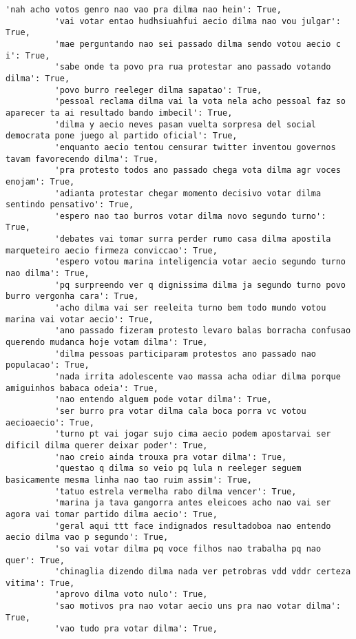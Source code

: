 \documentclass[11pt]{article}
\begin{document}
\begin{Verbatim}[commandchars=\\\{\}]
          'nah acho votos genro nao vao pra dilma nao hein': True,
          'vai votar entao hudhsiuahfui aecio dilma nao vou julgar': True,
          'mae perguntando nao sei passado dilma sendo votou aecio c i': True,
          'sabe onde ta povo pra rua protestar ano passado votando dilma': True,
          'povo burro reeleger dilma sapatao': True,
          'pessoal reclama dilma vai la vota nela acho pessoal faz so aparecer ta ai resultado bando imbecil': True,
          'dilma y aecio neves pasan vuelta sorpresa del social democrata pone juego al partido oficial': True,
          'enquanto aecio tentou censurar twitter inventou governos tavam favorecendo dilma': True,
          'pra protesto todos ano passado chega vota dilma agr voces enojam': True,
          'adianta protestar chegar momento decisivo votar dilma sentindo pensativo': True,
          'espero nao tao burros votar dilma novo segundo turno': True,
          'debates vai tomar surra perder rumo casa dilma apostila marqueteiro aecio firmeza conviccao': True,
          'espero votou marina inteligencia votar aecio segundo turno nao dilma': True,
          'pq surpreendo ver q dignissima dilma ja segundo turno povo burro vergonha cara': True,
          'acho dilma vai ser reeleita turno bem todo mundo votou marina vai votar aecio': True,
          'ano passado fizeram protesto levaro balas borracha confusao querendo mudanca hoje votam dilma': True,
          'dilma pessoas participaram protestos ano passado nao populacao': True,
          'nada irrita adolescente vao massa acha odiar dilma porque amiguinhos babaca odeia': True,
          'nao entendo alguem pode votar dilma': True,
          'ser burro pra votar dilma cala boca porra vc votou aecioaecio': True,
          'turno pt vai jogar sujo cima aecio podem apostarvai ser dificil dilma querer deixar poder': True,
          'nao creio ainda trouxa pra votar dilma': True,
          'questao q dilma so veio pq lula n reeleger seguem basicamente mesma linha nao tao ruim assim': True,
          'tatuo estrela vermelha rabo dilma vencer': True,
          'marina ja tava gangorra antes eleicoes acho nao vai ser agora vai tomar partido dilma aecio': True,
          'geral aqui ttt face indignados resultadoboa nao entendo aecio dilma vao p segundo': True,
          'so vai votar dilma pq voce filhos nao trabalha pq nao quer': True,
          'chinaglia dizendo dilma nada ver petrobras vdd vddr certeza vitima': True,
          'aprovo dilma voto nulo': True,
          'sao motivos pra nao votar aecio uns pra nao votar dilma': True,
          'vao tudo pra votar dilma': True,

\end{Verbatim}
\end{document}
